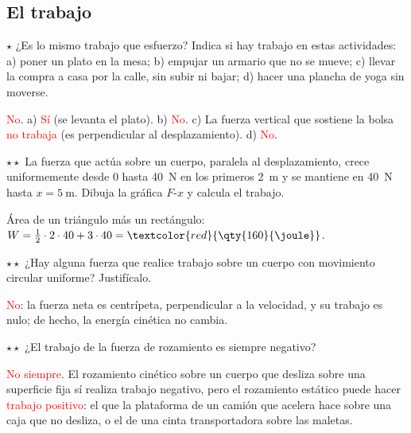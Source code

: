 \subsection{El trabajo}

\begin{exercise}
    \(\star\) ¿Es lo mismo trabajo que esfuerzo? Indica si hay trabajo en estas actividades: a) poner un plato en la mesa; b) empujar un
    armario que no se mueve; c) llevar la compra a casa por la calle, sin subir ni bajar; d) hacer una plancha de yoga sin moverse.
    \begin{solu}
        \textcolor{red}{No}. a) \textcolor{red}{Sí} (se levanta el plato). b) \textcolor{red}{No}. c) La fuerza vertical que sostiene la
        bolsa \textcolor{red}{no trabaja} (es perpendicular al desplazamiento). d) \textcolor{red}{No}.
    \end{solu}
\end{exercise}

\begin{exercise}
    \(\star\star\) La fuerza que actúa sobre un cuerpo, paralela al desplazamiento, crece uniformemente desde 0 hasta \qty{40}{\newton}
    en los primeros \qty{2}{\m} y se mantiene en \qty{40}{\newton} hasta \(x = \qty{5}{\m}\). Dibuja la gráfica \(F\)-\(x\) y calcula el
    trabajo.
    \begin{solu}
        Área de un triángulo más un rectángulo: \(W = \frac{1}{2} \cdot 2 \cdot 40 + 3 \cdot 40 = \textcolor{red}{\qty{160}{\joule}}\).
    \end{solu}
\end{exercise}

\begin{exercise}
    \(\star\star\) ¿Hay alguna fuerza que realice trabajo sobre un cuerpo con movimiento circular uniforme? Justifícalo.
    \begin{solu}
        \textcolor{red}{No}: la fuerza neta es centrípeta, perpendicular a la velocidad, y su trabajo es nulo; de hecho, la energía
        cinética no cambia.
    \end{solu}
\end{exercise}

\begin{exercise}
    \(\star\star\) ¿El trabajo de la fuerza de rozamiento es siempre negativo?
    \begin{solu}
        \textcolor{red}{No siempre}. El rozamiento cinético sobre un cuerpo que desliza sobre una superficie fija sí realiza trabajo
        negativo, pero el rozamiento estático puede hacer \textcolor{red}{trabajo positivo}: el que la plataforma de un camión que acelera
        hace sobre una caja que no desliza, o el de una cinta transportadora sobre las maletas.
    \end{solu}
\end{exercise}

